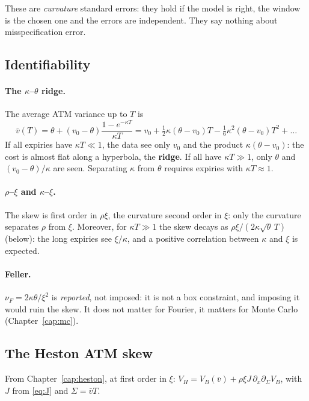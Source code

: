 \begin{attenzione}
These are \emph{curvature} standard errors: they hold if the model is right, the window is the chosen one and the
errors are independent. They say nothing about misspecification error.
\end{attenzione}

\subsection{Identifiability}
\label{sec:cal-ident}
\paragraph{\texorpdfstring{The $\kappa$--$\theta$ ridge.}{The kappa-theta ridge.}} The average ATM variance up to $T$
is
\begin{equation}\label{eq:cal-vbar}
\bar v(T)=\theta+(v_0-\theta)\frac{1-e^{-\kappa T}}{\kappa T}=v_0+\tfrac12\kappa(\theta-v_0)T-\tfrac16\kappa^2(\theta-v_0)T^2+\dots
\end{equation}
If all expiries have $\kappa T\ll1$, the data see only $v_0$ and the product $\kappa(\theta-v_0)$: the cost is almost
flat along a hyperbola, the \textbf{ridge}. If all have $\kappa T\gg1$, only $\theta$ and $(v_0-\theta)/\kappa$ are
seen. Separating $\kappa$ from $\theta$ requires expiries with $\kappa T\approx1$.

\paragraph{\texorpdfstring{$\rho$--$\xi$ and $\kappa$--$\xi$.}{rho-xi and kappa-xi.}} The skew is first order in
$\rho\xi$, the curvature second order in $\xi$: only the curvature separates $\rho$ from $\xi$. Moreover, for
$\kappa T\gg1$ the skew decays as $\rho\xi/(2\kappa\sqrt\theta\,T)$ (below): the long expiries see $\xi/\kappa$, and
a positive correlation between $\kappa$ and $\xi$ is expected.

\paragraph{Feller.} $\nu_F=2\kappa\theta/\xi^2$ is \emph{reported}, not imposed: it is not a box constraint, and
imposing it would ruin the skew. It does not matter for Fourier, it matters for Monte Carlo (Chapter~\ref{cap:mc}).

\subsection{The Heston ATM skew}
\label{sec:cal-skew}
From Chapter~\ref{cap:heston}, at first order in $\xi$: $V_H=V_B(\bar v)+\rho\xi J\,\partial_x\partial_\Sigma V_B$,
with $J$ from \eqref{eq:J} and $\Sigma=\bar vT$.


